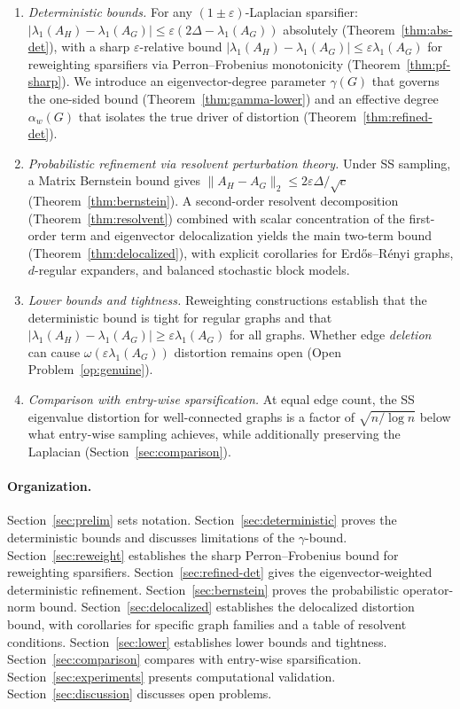 \documentclass[11pt]{article}
\theoremstyle{definition}
\newcommand{\eps}{\varepsilon}
\newcommand{\lamH}{\lambda_1(A_H)}
\newcommand{\lamG}{\lambda_1(A_G)}
\newcommand{\AG}{A_G}
\newcommand{\AH}{A_H}
\begin{document}
\begin{enumerate}[label=(\alph*),nosep]
\item \emph{Deterministic bounds.}
For any $(1\pm\eps)$-Laplacian sparsifier:
$|\lamH - \lamG| \leq \eps(2\Delta - \lamG)$ absolutely
(Theorem~\ref{thm:abs-det}), with a sharp $\eps$-relative bound
$|\lamH - \lamG| \leq \eps\lamG$ for reweighting sparsifiers via Perron--Frobenius
monotonicity (Theorem~\ref{thm:pf-sharp}). We introduce an eigenvector-degree
parameter $\gamma(G)$ that governs the one-sided bound
(Theorem~\ref{thm:gamma-lower}) and an effective degree $\alpha_w(G)$ that
isolates the true driver of distortion (Theorem~\ref{thm:refined-det}).

\item \emph{Probabilistic refinement via resolvent perturbation theory.}
Under SS sampling, a Matrix Bernstein bound gives
$\|\AH - \AG\|_2 \leq 2\eps\Delta/\sqrt{c}$ (Theorem~\ref{thm:bernstein}).
A second-order resolvent decomposition (Theorem~\ref{thm:resolvent})
combined with scalar concentration of the first-order term and eigenvector
delocalization yields the main two-term bound
(Theorem~\ref{thm:delocalized}), with explicit corollaries for
Erd\H{o}s--R\'{e}nyi graphs, $d$-regular expanders, and balanced stochastic
block models.

\item \emph{Lower bounds and tightness.}
Reweighting constructions establish that the deterministic bound is tight for
regular graphs and that $|\lamH - \lamG| \geq \eps\lamG$ for all graphs.
Whether edge \emph{deletion} can cause $\omega(\eps\lamG)$ distortion
remains open (Open Problem~\ref{op:genuine}).

\item \emph{Comparison with entry-wise sparsification.}
At equal edge count, the SS eigenvalue distortion for well-connected graphs
is a factor of $\sqrt{n/\log n}$ below what entry-wise sampling achieves,
while additionally preserving the Laplacian (Section~\ref{sec:comparison}).
\end{enumerate}

\paragraph{Organization.}
Section~\ref{sec:prelim} sets notation.
Section~\ref{sec:deterministic} proves the deterministic bounds and discusses
limitations of the $\gamma$-bound.
Section~\ref{sec:reweight} establishes the sharp Perron--Frobenius bound for
reweighting sparsifiers.
Section~\ref{sec:refined-det} gives the eigenvector-weighted deterministic refinement.
Section~\ref{sec:bernstein} proves the probabilistic operator-norm bound.
Section~\ref{sec:delocalized} establishes the delocalized distortion bound,
with corollaries for specific graph families and a table of resolvent conditions.
Section~\ref{sec:lower} establishes lower bounds and tightness.
Section~\ref{sec:comparison} compares with entry-wise sparsification.
Section~\ref{sec:experiments} presents computational validation.
Section~\ref{sec:discussion} discusses open problems.
\end{document}
